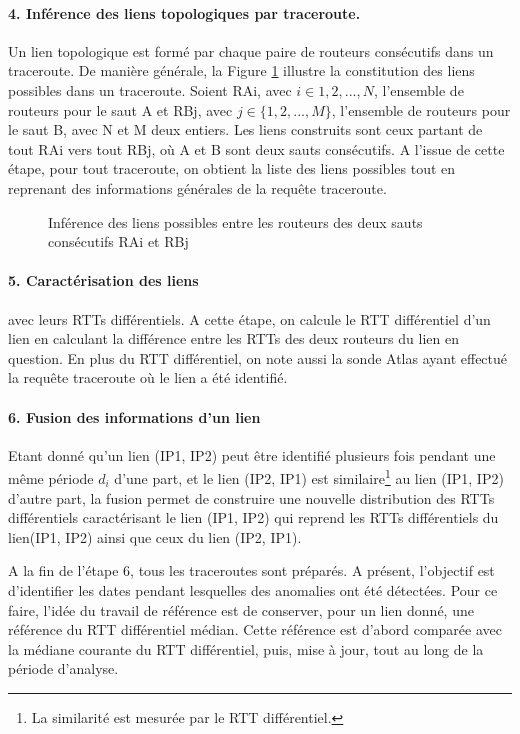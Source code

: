 \paragraph{4. Inférence des liens topologiques par traceroute.} Un lien topologique est formé par chaque paire de routeurs consécutifs dans un traceroute. De manière générale, la Figure \ref{fig:link-inference} illustre la constitution des liens possibles  dans un traceroute. Soient  RAi, avec $i \in {1,2, ...,N}$,  l'ensemble de routeurs pour le saut A et RBj, avec $j \in \{1,2, ..., M\}$, l'ensemble  de routeurs pour le saut B, avec N et M deux entiers. Les liens  construits sont ceux partant de tout RAi vers tout RBj, où A et B sont deux sauts consécutifs. A l'issue de cette étape, pour tout traceroute, on obtient la liste des liens possibles tout en reprenant des informations générales de la requête traceroute.
\begin{figure}[H]
	\centering
	\captionsetup{justification=centering}
	
	\caption{Inférence des liens possibles entre les routeurs des deux sauts consécutifs RAi et RBj}
	\label{fig:link-inference}
\end{figure}
\paragraph{5. Caractérisation des liens} avec leurs RTTs différentiels. A cette étape, on calcule le RTT différentiel d'un lien en calculant la différence entre les RTTs des deux routeurs du lien en question. En plus du RTT différentiel, on note aussi la sonde Atlas ayant effectué la requête traceroute où le lien a été identifié. 

\paragraph{6. Fusion des informations d'un lien} Etant donné qu'un lien (IP1, IP2) peut être identifié plusieurs fois pendant une même période $d_i$ d'une part, et le lien (IP2, IP1) est similaire\footnote{La similarité est mesurée par le RTT différentiel.} au lien  (IP1, IP2) d'autre part, la fusion permet de construire une nouvelle distribution des RTTs différentiels caractérisant le lien (IP1, IP2) qui reprend les RTTs différentiels du lien(IP1, IP2) ainsi que ceux du lien (IP2, IP1).


A la fin de l'étape 6, tous les traceroutes sont préparés. A présent, l'objectif est d'identifier les dates pendant lesquelles des anomalies ont été détectées. Pour ce faire, l'idée du travail de référence est de conserver, pour un lien donné, une référence du RTT différentiel médian.  Cette référence est d'abord comparée avec la médiane courante du RTT différentiel,  puis,  mise à jour,   tout au long de la période d'analyse.

